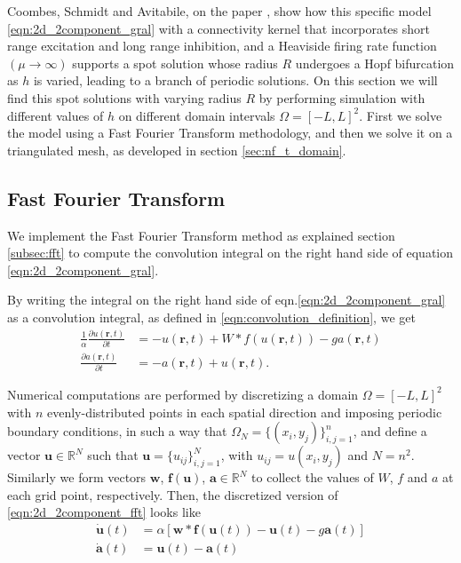 \documentclass{uonmathreport}
\begin{document}
Coombes, Schmidt and Avitabile, on the paper \cite{coombes2014spots}, show how this specific model \ref{eqn:2d_2component_gral} with a connectivity kernel that incorporates short range excitation and long range inhibition, and a Heaviside firing rate function $(\mu \rightarrow \infty)$ supports a spot solution whose radius $R$ undergoes a Hopf bifurcation as $h$ is varied, leading to a branch of periodic solutions. On this section we will find this spot solutions with varying radius $R$ by performing simulation with different values of $h$ on different domain intervals $\Omega = [-L,L]^2$. First we solve the model using a Fast Fourier Transform methodology, and then we solve it on a triangulated mesh, as developed in section \ref{sec:nf_t_domain}.

\subsection{Fast Fourier Transform} \label{subsec:adaptation_fft_discretization}
We implement the Fast Fourier Transform method as explained section \ref{subsec:fft} to compute the convolution integral on the right hand side of equation \ref{eqn:2d_2component_gral}.

By writing the integral on the right hand side of eqn.\ref{eqn:2d_2component_gral} as a convolution integral, as defined in \ref{eqn:convolution_definition}, we get
\begin{subequations}\label{eqn:2d_2component_fft}
	\begin{align}
		\frac{1}{\alpha} \frac{\partial u(\textbf{r},t)}{\partial t} &= -u(\textbf{r},t) + W * f(u(\textbf{r},t)) - g a(\textbf{r},t)\\
		\frac{\partial a(\textbf{r},t)}{\partial t} &= -a(\textbf{r},t) + u(\textbf{r},t).
	\end{align}
\end{subequations}

Numerical computations are performed by discretizing a domain $\Omega = [-L,L]^2$ with $n$ evenly-distributed points in each spatial direction and imposing periodic boundary conditions, in such a way that $\Omega_N = \{(x_i, y_j)\}_{i,j=1}^n$, and define a vector $\textbf{u} \in \mathbb{R}^{N}$ such that $\textbf{u}=\{u_{ij}\}_{i,j=1}^N$, with $u_{ij}=u(x_i, y_j)$ and $N=n^2$. Similarly we form vectors $\textbf{w}$, $\textbf{f}(\textbf{u})$, $\textbf{a} \in \mathbb{R}^{N}$ to collect the values of $W$, $f$ and $a$ at each grid point, respectively. Then, the discretized version of \ref{eqn:2d_2component_fft} looks like
\begin{subequations}\label{eqn:2d_2component_fft_discrete}
	\begin{align}
		\dot{\textbf{u}}(t) &= \alpha[\textbf{w} * \textbf{f}(\textbf{u}(t))-\textbf{u}(t) - g\textbf{a}(t)]\\
		\dot{\textbf{a}}(t) &= \textbf{u}(t) - \textbf{a}(t)
	\end{align}
\end{subequations}
  
\end{document}
